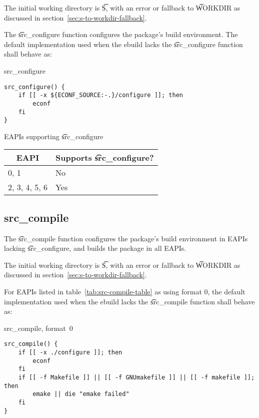 The initial working directory is \t{S}, with an error or fallback to \t{WORKDIR} as discussed in
section~\ref{sec:s-to-workdir-fallback}.

The \t{src\_configure} function configures the package's build environment. The default
implementation used when the ebuild lacks the \t{src\_configure} function shall behave as:

\begin{listing}[H]
\caption{src\_configure} \label{lst:src-configure}
\begin{verbatim}
src_configure() {
    if [[ -x ${ECONF_SOURCE:-.}/configure ]]; then
        econf
    fi
}
\end{verbatim}
\end{listing}

\begin{centertable}{EAPIs supporting \t{src\_configure}}
    \label{tab:src-configure-table}
    \begin{tabular}{ll}
      \toprule
      \multicolumn{1}{c}{\textbf{EAPI}} &
      \multicolumn{1}{c}{\textbf{Supports \t{src\_configure}?}} \\
      \midrule
      0, 1              & No  \\
      2, 3, 4, 5, 6     & Yes \\
      \bottomrule
    \end{tabular}
\end{centertable}

\subsection{src\_compile}
\label{sec:src-compile-function}

 The \t{src\_compile} function configures the package's build environment
in EAPIs lacking \t{src\_configure}, and builds the package in all EAPIs.

The initial working directory is \t{S}, with an error or fallback to \t{WORKDIR} as discussed in
section~\ref{sec:s-to-workdir-fallback}.

 For EAPIs listed in table~\ref{tab:src-compile-table} as using format
0, the default implementation used when the ebuild lacks the \t{src\_compile} function shall behave
as:

\begin{listing}[H]
\caption{src\_compile, format~0} \label{lst:src-compile-0}
\begin{verbatim}
src_compile() {
    if [[ -x ./configure ]]; then
        econf
    fi
    if [[ -f Makefile ]] || [[ -f GNUmakefile ]] || [[ -f makefile ]]; then
        emake || die "emake failed"
    fi
}
\end{verbatim}
\end{listing}

